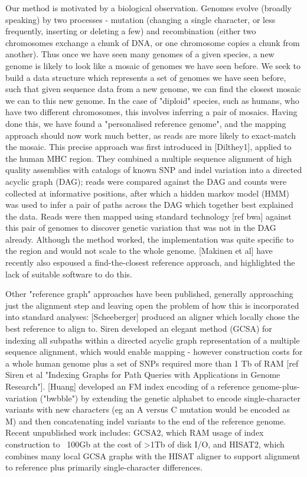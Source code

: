 \documentclass[runningheads,a4paper]{llncs}
\begin{document}
Our method is motivated by a biological observation. Genomes evolve (broadly speaking) by two processes - mutation (changing a single character, or less frequently, inserting or deleting a few) and recombination (either two chromosomes exchange a chunk of DNA, or one chromosome copies a chunk from another). Thus once we have seen many genomes of a given species, a new genome is likely to look like a mosaic of genomes we have seen before.  We seek to build a data structure which represents a set of genomes we have seen before, such that given sequence data from a new genome, we can find the closest mosaic we can to this new genome. In the case of "diploid" species, such as humans, who have two different chromosomes, this involves inferring a pair of mosaics. Having done this, we have found a "personalised reference genome", and the mapping approach should now work much better, as reads are more likely to exact-match the mosaic. This precise approach was first introduced in [Dilthey1], applied to the human MHC region. They combined a multiple sequence alignment of high quality assemblies with catalogs of known SNP and indel variation into a directed acyclic graph (DAG); reads were compared against the DAG and counts were collected at informative positions, after which a hidden markov model (HMM) was used to infer a pair of paths across the DAG which together best explained the data. Reads were then mapped using standard technology [ref bwa] against this pair of genomes to discover genetic variation that was not in the DAG already. Although the method worked, the implementation was quite specific to the region and would not scale to the whole genome. [Makinen et al] have recently also espoused a find-the-closest reference approach, and highlighted the lack of suitable software to do this.

Other "reference graph" approaches have been published, generally approaching just the alignment step and leaving open the problem of how this is incorporated into standard analyses: [Scheeberger] produced an aligner which locally chose the best reference to align to. Siren developed an elegant method (GCSA) for indexing all subpaths within a directed acyclic graph representation of a multiple sequence alignment, which would enable mapping - however construction costs for a whole human genome plus a set of SNPs required more than 1 Tb of RAM [ref Siren et al "Indexing Graphs for Path Queries with Applications in Genome Research"]. [Huang] developed an FM index encoding of a reference genome-plus-variation ("bwbble") by extending the genetic alphabet to encode single-character variants with new characters (eg an A versus C mutation would be encoded as M) and then concatenating indel variants to the end of the reference genome. Recent unpublished work includes: GCSA2, which  RAM usage of index construction to ~100Gb at the cost of >1Tb of disk I/O, and HISAT2, which combines many local GCSA graphs with the HISAT aligner to support alignment to reference plus primarily single-character differences.   
\end{document}
